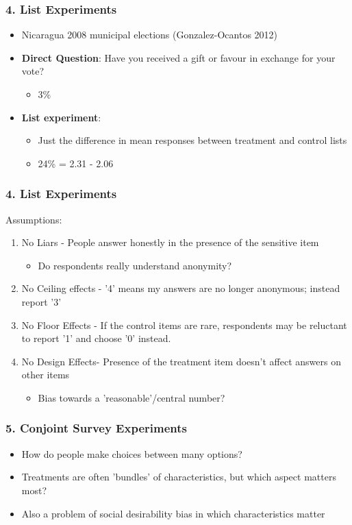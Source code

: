 \documentclass[xcolor=x11names,compress]{beamer}\usepackage[]{graphicx}\usepackage[]{color}
\renewcommand{\(}{\begin{columns}}
\renewcommand{\)}{\end{columns}}
\newcommand{\<}[1]{\begin{column}{#1}}
\renewcommand{\>}{\end{column}}
\begin{document}
\begin{frame}
\frametitle{4. List Experiments}
\begin{itemize}
\item Nicaragua 2008 municipal elections (Gonzalez-Ocantos 2012)
\item \textbf{Direct Question}: Have you received a gift or favour in exchange for your vote?
\begin{itemize}
\item 3\%
\pause
\end{itemize}
\item \textbf{List experiment}:
\begin{itemize}
\item Just the difference in mean responses between treatment and control lists
\item 24\% = 2.31 - 2.06
\end{itemize}
\end{itemize}
\end{frame}

\begin{frame}
\frametitle{4. List Experiments}
Assumptions:
\begin{enumerate}
\item No Liars - People answer honestly in the presence of the sensitive item
\pause
\begin{itemize}
\item Do respondents really understand anonymity?
\end{itemize}
\pause
\item No Ceiling effects - '4' means my answers are no longer anonymous; instead report '3'
\pause
\item No Floor Effects - If the control items are rare, respondents may be reluctant to report '1' and choose '0' instead.
\pause
\item No Design Effects- Presence of the treatment item doesn't affect answers on other items
\begin{itemize}
\item Bias towards a 'reasonable'/central number?
\end{itemize}
\end{enumerate}
\end{frame}

\begin{frame}
\frametitle{5. Conjoint Survey Experiments}
\begin{itemize}
\item How do people make choices between many options?
\pause
\item Treatments are often 'bundles' of characteristics, but which aspect matters most?
\pause
\item Also a problem of social desirability bias in which characteristics matter
\end{itemize}
\end{frame}
\end{document}
